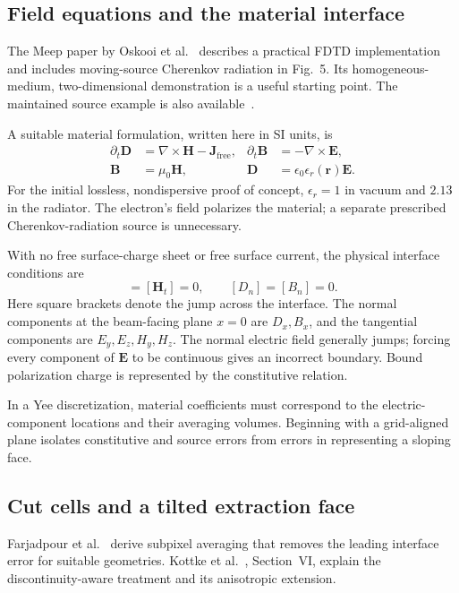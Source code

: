 \documentclass[11pt,a4paper]{article}
\numberwithin{equation}{section}
\begin{document}
\subsection{Field equations and the material interface}

The Meep paper by Oskooi et al.~\cite{oskooi2010meep} describes a practical
FDTD implementation and includes moving-source Cherenkov radiation in
Fig.~5. Its homogeneous-medium, two-dimensional demonstration is a useful
starting point. The maintained source example is also available~\cite{meepMovingSource}.

A suitable material formulation, written here in SI units, is
\begin{align}
 \partial_t\mathbf D&=\nabla\times\mathbf H-\mathbf J_{\mathrm{free}},
 &\partial_t\mathbf B&=-\nabla\times\mathbf E, \label{eq:maxwell}\\
 \mathbf B&=\mu_0\mathbf H,
 &\mathbf D&=\epsilon_0\epsilon_r(\mathbf r)\mathbf E. \label{eq:constitutive}
\end{align}
For the initial lossless, nondispersive proof of concept,
\(\epsilon_r=1\) in vacuum and \(2.13\) in the radiator.
The electron's field polarizes the material; a separate prescribed
Cherenkov-radiation source is unnecessary.

With no free surface-charge sheet or free surface current, the physical
interface conditions are
\begin{equation}
 [\mathbf E_t]=[\mathbf H_t]=0,\qquad [D_n]=[B_n]=0.
 \label{eq:interface}
\end{equation}
Here square brackets denote the jump across the interface. The normal
components at the beam-facing plane \(x=0\) are \(D_x,B_x\), and the
tangential components are \(E_y,E_z,H_y,H_z\). The normal
electric field generally jumps; forcing every component of \(\mathbf E\)
to be continuous gives an incorrect boundary. Bound polarization charge
is represented by the constitutive relation.

In a Yee discretization, material coefficients must correspond to the
electric-component locations and their averaging volumes. Beginning with a
grid-aligned plane isolates constitutive and source errors from errors
in representing a sloping face.

\subsection{Cut cells and a tilted extraction face}

Farjadpour et al.~\cite{farjadpour2006subpixel} derive subpixel averaging
that removes the leading interface error for suitable geometries.
Kottke et al.~\cite{kottke2008interfaces}, Section~VI, explain the
discontinuity-aware treatment and its anisotropic extension.
\end{document}
